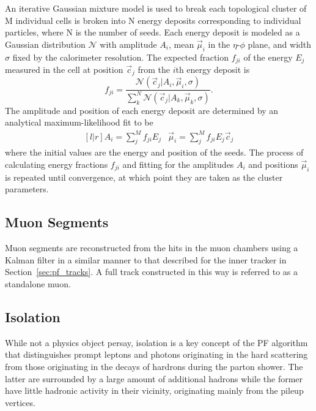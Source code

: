 An iterative Gaussian mixture model is used to break each topological cluster of M individual cells is broken into N energy deposits corresponding to individual particles, where N is the number of seeds.
Each energy deposit is modeled as a Gaussian distribution $\mathcal{N}$ with amplitude $A_i$, mean $\vec \mu_i$ in the $\eta$-$\phi$ plane, and width $\sigma$ fixed by the calorimeter resolution.
The expected fraction $f_{ji}$ of the energy $E_j$ measured in the cell at position $\vec c_j$ from the $i$th energy deposit is
\begin{equation}
  f_{ji} = \dfrac{\mathcal{N}\left(\vec c_j | A_i, \vec \mu_i, \sigma\right)}
  {\sum_k^N \mathcal{N}\left(\vec c_j | A_k, \vec \mu_k, \sigma\right)}.
\end{equation}
The amplitude and position of each energy deposit are determined by an analytical maximum-likelihood fit to be
\begin{equation}
  \begin{matrix}[l | r]
    A_i = \sum\limits_j^M f_{ji} E_j &
    \vec \mu_i = \sum\limits_j^M f_{ji} E_j \vec c_j
  \end{matrix}
\end{equation}
where the initial values are the energy and position of the seeds.
The process of calculating energy fractions $f_{ji}$ and fitting for the amplitudes $A_i$ and positions $\vec \mu_i$ is repeated until convergence, at which point they are taken as the cluster parameters.

\subsection{Muon Segments}
\label{sec:pf_segments}

Muon segments are reconstructed from the hits in the muon chambers using a Kalman filter in a similar manner to that described for the inner tracker in Section~\ref{sec:pf_tracks}.
A full track constructed in this way is referred to as a standalone muon.

\subsection{Isolation}
\label{sec:pf_iso}

While not a physics object persay, isolation is a key concept of the PF algorithm that  distinguishes prompt leptons and photons originating in the hard scattering from those originating in the decays of hardrons during the parton shower.
The latter are surrounded by a large amount of additional hadrons while the former have little hadronic activity in their vicinity, originating mainly from the pileup vertices.

